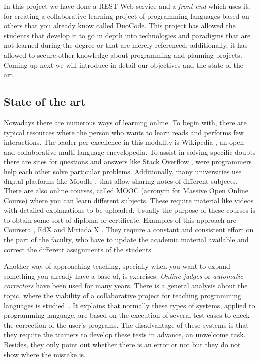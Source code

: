
In this project we have done a REST Web service and a \emph{front-end} which uses it, for creating a collaborative learning project of programming languages based on others that you already know called DuoCode. This project has allowed the students that develop it to go in depth into technologies and paradigms that are not learned during the degree or that are merely referenced; additionally, it has allowed to secure other knowledge about programming and planning projects. Coming up next we will introduce in detail our objectives and the state of the art.

\subsection{State of the art\label{subsec:introductionEN}}

Nowadays there are numerous ways of learning online. To begin with, there are typical resources where the person who wants to learn reads and performs few interactions. The leader per excellence in this modality is Wikipedia \cite{wiki}, an open and collaborative multi-language encyclopedia. To assist in solving specific doubts there are sites for questions and answers like Stack Overflow \cite{stack}, were programmers help each other solve particular problems. Additionally, many universities use digital platforms like Moodle \cite{moodle}, that allow sharing notes of different subjects. There are also online courses, called MOOC (acronym for Massive Open Online Course) where you can learn different subjects. These require material like videos with detailed explanations to be uploaded. Usually the purpose of these courses is to obtain some sort of diploma or certificate. Examples of this approach are Coursera \cite{coursera}, EdX \cite{edX} and Miriada X \cite{miriadaX}. They require a constant and consistent effort on the part of the faculty, who have to update the academic material available and correct the different assignments of the students.

Another way of approaching teaching, specially when you want to expand something you already have a base of, is exercises. \emph{Online judges} or \emph{automatic correctors} have been used for many years. There is a general analysis about the topic, where the viability of a collaborative project for teaching programming languages is studied~\cite{pimcdDuoCode14}. It explains that normally these types of systems, applied to programming language, are based on the execution of several test cases to check the correction of the user's programs. The disadvantage of these systems is that they require the trainers to develop these tests in advance, an unwelcome task. Besides, they only point out whether there is an error or not but they do not show where the mistake is.

